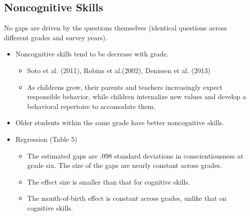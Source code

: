 \documentclass[../root]{subfiles}
\begin{document}
    \subsection{Noncognitive Skills}No gaps are driven by the questions themselves (identical questions across different grades and survey years).

    \begin{itemize}
      \item Noncognitive skills tend to be decrease with grade.
      \begin{itemize}
        \item Soto et al. (2011), Robins et al.(2002), Denissen et al. (2013)
        \item As childrens grow, their parents and teachers increasingly expect responsible behavior, while children internalize new values and develop a behavioral repertoire to accomodate them.
      \end{itemize}
      \item Older students within the same grade have better noncognitive skills.
      \item Regression (Table 5)
      \begin{itemize}
        \item The estimated gaps are .098 standard deviations in conscientiousness at grade six. The size of the gaps are nearly constant across grades.
        \item The effect size is smaller than that for cognitive skills.
        \item The month-of-birth effect is constant across grades, unlike that on cognitive skills.
      \end{itemize}
    \end{itemize}
\end{document}
